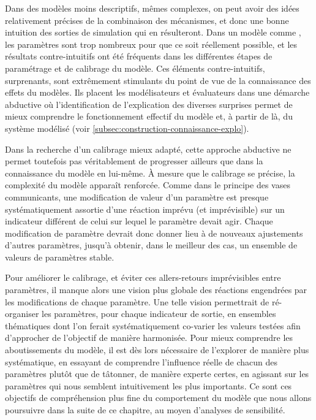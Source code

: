 Dans des modèles moins descriptifs, mêmes complexes, on peut avoir des idées relativement précises de la combinaison des mécanismes, et donc une bonne intuition des sorties de simulation qui en résulteront.
Dans un modèle comme \simfeodal{}, les paramètres sont trop nombreux pour que ce soit réellement possible, et les résultats contre-intuitifs ont été fréquents dans les différentes étapes de paramétrage et de calibrage du modèle.
Ces éléments contre-intuitifs, surprenants, sont extrêmement stimulants du point de vue de la connaissance des effets du modèles.
Ils placent les modélisateurs et évaluateurs dans une démarche abductive où l'identification de l'explication des diverses surprises permet de mieux comprendre le fonctionnement effectif du modèle et, à partir de là, du système modélisé (voir \cref{subsec:construction-connaissance-explo}).

Dans la recherche d'un calibrage mieux adapté, cette approche abductive ne permet toutefois pas véritablement de progresser ailleurs que dans la connaissance du modèle en lui-même.
À mesure que le calibrage se précise, la complexité du modèle apparaît renforcée.
Comme dans le principe des vases communicants, une modification de valeur d'un paramètre est presque systématiquement assortie d'une réaction imprévu (et imprévisible) sur un indicateur différent de celui sur lequel le paramètre devait agir.
Chaque modification de paramètre devrait donc donner lieu à de nouveaux ajustements d'autres paramètres, jusqu'à obtenir, dans le meilleur des cas, un ensemble de valeurs de paramètres stable.

Pour améliorer le calibrage, et éviter ces allers-retours imprévisibles entre paramètres, il manque alors une vision plus globale des réactions engendrées par les modifications de chaque paramètre.
Une telle vision permettrait de ré-organiser les paramètres, pour chaque indicateur de sortie, en ensembles thématiques dont l'on ferait systématiquement co-varier les valeurs testées afin d'approcher de l'objectif de manière harmonisée.
Pour mieux comprendre les aboutissements du modèle, il est dès lors nécessaire de l'explorer de manière plus systématique, en essayant de comprendre l'influence réelle de chacun des paramètres plutôt que de tâtonner, de manière experte certes, en agissant sur les paramètres qui nous semblent intuitivement les plus importants.
Ce sont ces objectifs de compréhension plus fine du comportement du modèle que nous allons poursuivre dans la suite de ce chapitre, au moyen d'analyses de sensibilité.


